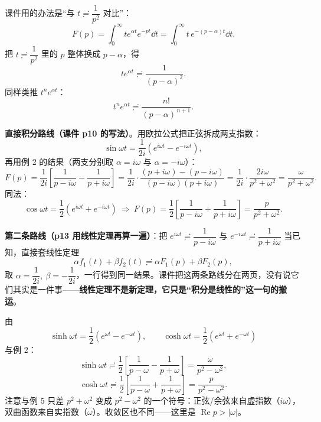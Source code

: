\documentclass[11pt]{ctexart}
\begin{document}
课件用的办法是“与 $t\risingdotseq\dfrac{1}{p^2}$ 对比”：
\[ F(p)=\int_{0}^{\infty}te^{\alpha t}e^{-pt}\dd t=\int_{0}^{\infty}t\,e^{-(p-\alpha)t}\dd t .\]
把 $t\risingdotseq\dfrac{1}{p^{2}}$ 里的 $p$ 整体换成 $p-\alpha$，得
\[ te^{\alpha t}\risingdotseq\frac{1}{(p-\alpha)^{2}} .\]
同样类推 $t^ne^{\alpha t}$：
\[ t^{n}e^{\alpha t}\risingdotseq\frac{n!}{(p-\alpha)^{\,n+1}} .\]



\textbf{直接积分路线（课件 p10 的写法）}。用欧拉公式把正弦拆成两支指数：
\[ \sin\omega t=\frac{1}{2i}\left(e^{i\omega t}-e^{-i\omega t}\right), \]
再用例 2 的结果（两支分别取 $\alpha=i\omega$ 与 $\alpha=-i\omega$）：
\[
F(p)=\frac{1}{2i}\left[\frac{1}{p-i\omega}-\frac{1}{p+i\omega}\right]
=\frac{1}{2i}\cdot\frac{(p+i\omega)-(p-i\omega)}{(p-i\omega)(p+i\omega)}
=\frac{1}{2i}\cdot\frac{2i\omega}{p^{2}+\omega^{2}}
=\frac{\omega}{p^{2}+\omega^{2}} .
\]
同法：
\[ \cos\omega t=\frac{1}{2}\left(e^{i\omega t}+e^{-i\omega t}\right)
\ \Longrightarrow\ 
F(p)=\frac{1}{2}\left[\frac{1}{p-i\omega}+\frac{1}{p+i\omega}\right]
=\frac{p}{p^{2}+\omega^{2}} .\]


\textbf{第二条路线（p13 用线性定理再算一遍）}：把 $e^{i\omega t}\risingdotseq\dfrac{1}{p-i\omega}$ 与 $e^{-i\omega t}\risingdotseq\dfrac{1}{p+i\omega}$ 当已知，直接套线性定理
\[ \alpha f_1(t)+\beta f_2(t)\risingdotseq\alpha F_1(p)+\beta F_2(p) ,\]
取 $\alpha=\dfrac{1}{2i},\ \beta=-\dfrac{1}{2i}$，一行得到同一结果。课件把这两条路线分在两页，没有说它们其实是一件事——\textbf{线性定理不是新定理，它只是“积分是线性的”这一句的搬运}。


由
\[ \sinh\omega t=\frac{1}{2}\left(e^{\omega t}-e^{-\omega t}\right),\qquad
\cosh\omega t=\frac{1}{2}\left(e^{\omega t}+e^{-\omega t}\right) \]
与例 2：
\[ \sinh\omega t\risingdotseq\frac{1}{2}\left[\frac{1}{p-\omega}-\frac{1}{p+\omega}\right]=\frac{\omega}{p^{2}-\omega^{2}} ,\]
\[ \cosh\omega t\risingdotseq\frac{1}{2}\left[\frac{1}{p-\omega}+\frac{1}{p+\omega}\right]=\frac{p}{p^{2}-\omega^{2}} .\]
注意与例 5 只差 $p^{2}+\omega^{2}$ 变成 $p^{2}-\omega^{2}$ 的一个符号：正弦/余弦来自虚指数（$i\omega$），双曲函数来自实指数（$\omega$）。收敛区也不同——这里是 $\operatorname{Re}p>|\omega|$。
\end{document}
